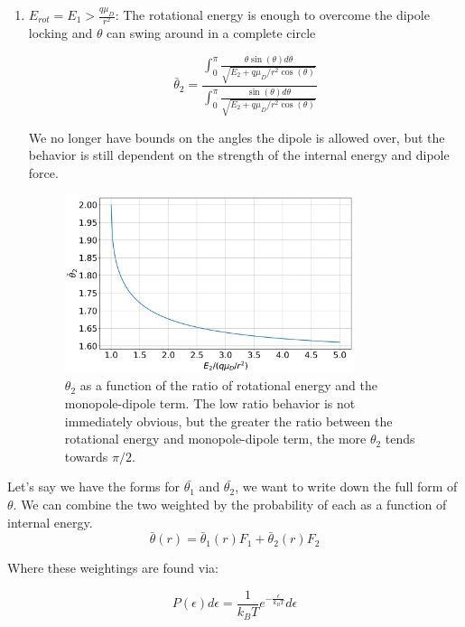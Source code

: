 \begin{enumerate}
	\item $E_{rot} = E_1 > \frac{q \mu_D}{r^2}$:
	The rotational energy is enough to overcome the dipole locking and $\theta$ can swing around in a complete circle

	\begin{equation}
	    \bar{\theta}_2  = \frac{\int_0^\pi \frac{\theta \sin(\theta) d\theta}{\sqrt{E_2 + q \mu_D/r^2 \cos(\theta)}}}{\int_0^\pi \frac{\sin(\theta) d \theta}{\sqrt{E_2 + q \mu_D/r^2 \cos(\theta)}}}
	\end{equation}

	We no longer have bounds on the angles the dipole is allowed over, but the behavior is still dependent on the strength of the internal energy and dipole force.

	\begin{figure}[H]
		\label{fig: theta2}
		\centering
		\includegraphics[width=0.8\textwidth]{images/ADO_theta2.png}
		\caption{$\theta_2$ as a function of the ratio of rotational energy and the monopole-dipole term. The low ratio behavior is not immediately obvious, but the greater the ratio between the rotational energy and monopole-dipole term, the more $\theta_2$ tends towards $\pi/2$.}
	\end{figure}

\end{enumerate}

Let's say we have the forms for $\bar{\theta_1}$ and $\bar{\theta_2}$, we want to write down the full form of $\theta$. We can combine the two weighted by the probability of each as a function of internal energy.
\begin{equation*}
    \bar{\theta}(r) = \bar{\theta}_1(r) F_1 + \bar{\theta}_2(r) F_2
\end{equation*}

Where these weightings are found via:

\begin{equation*}
    P(\epsilon) d\epsilon = \frac{1}{k_BT}e^{-\frac{\epsilon}{k_BT}}d\epsilon
\end{equation*}

